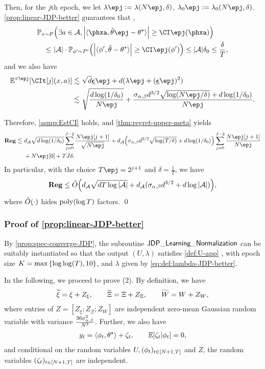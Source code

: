 Then, for the $j$th epoch, we let $\lambda\epj\defeq \lambda(N\epj,\delta)$, $\lamz\epj\defeq \lamz(N\epj,\delta)$. \cref{prop:linear-JDP-better} guarantees that \whp,
\begin{align*}
    \MoveEqLeft \PP_{x\sim P}\paren{ \exists a\in\cA, \abs{\lr \phxa, \hth\epj-\ths\rr}\geq \CI\epj(\phxa) } \\
    \leq&~ |\cA|\cdot \PP_{\x'\sim P'}\paren{  \abs{\lr \x', \hth-\ths \rr }\geq \CI\epj(\x') } \leq |\cA|\delz\leq \frac{\delta}{T},
\end{align*}
and we also have
\begin{align*}
    \EE^{\pi\epj}\brac{\CIt[j](x,a)}\leqsim &~ \sqrt{d}\lamgd\epj+d(\lambda\epj+(\lamgd\epj)^2)\\
    \leqsim&~\sqrt{\frac{d\log(1/\delz)}{N\epj}}+ \frac{\siga d^{3/2}\sqrt{\log(N\epj/\delta)}+d\log(1/\delz)}{N\epj}.
\end{align*}

Therefore, \cref{asmp:EstCI} holds, and \cref{thm:regret-upper-meta} yields
\begin{align*}
    \Reg\leqsim &~ \dA\sqrt{d\log(1/\delz)}\sum_{j=0}^{J-2} \frac{N\epj[j+1]}{\sqrt{N\epj}} + \dA\paren{\siga d^{3/2}\sqrt{\log(T/\delta)}+d\log(1/\delz)} \sum_{j=0}^{J-2} \frac{N\epj[j+1]}{N\epj} \\
    &~+N\epj[0]+TJ\delta.
\end{align*}
In particular, with the choice $T\epj=2^{j+1}$ and $\delta=\frac{1}{T}$, we have
\begin{align*}
    \mathbf{Reg}\leq \tilde{O}{\left(  d_{\mathcal{A}}\sqrt{dT\log|\mathcal{A}|} +d_{\mathcal{A}}(\sigma_{\alpha,\beta} d^{3/2}+d\log|\mathcal{A}|) \right)},
\end{align*}
where $\tilde{O}{\left( \cdot \right)}$ hides $\mathrm{poly}(\log T)$ factors.
\qed


\subsubsection{Proof of \cref{prop:linear-JDP-better}}

By \cref{prop:spec-converge-JDP}, the subroutine $\mathsf{JDP\_Learning\_Normalization}$ can be suitably instantiated so that the output $(U,\lambda)$ satisfies \eqref{def:U-app} , with epoch size $K=\max\left\{\log\log(T),10\right\}$, and $\lambda$ given by \eqref{eq:def:lambda-JDP-better}. 


In the following, we proceed to prove (2).
By definition, we have
\begin{align*}
    \widetilde \xi = \xi+Z_\xi, \qquad
    \widetilde \Xi=\Xi+Z_\Xi, \qquad
    \widetilde W = W+Z_W,
\end{align*}
where entries of $Z=[Z_\xi; Z_\Xi; Z_W]$ are independent zero-mean Gaussian random variable with variance $\frac{36\sigma_{\alpha,\beta}^2}{N^2}$. Further, we also have
\begin{align*}
    y_t=\langle \phi_t, \theta^\star\rangle+\zeta_t, \qquad \mathbb{E}[\zeta_t|\phi_t]=0,
\end{align*}
and conditional on the random variables $U, (\phi_t)_{t\in[N+1,T]}$ and $Z$, the random variables $(\zeta_t)_{t\in[N+1,T]}$ are independent.

